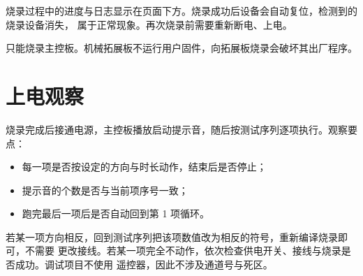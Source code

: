 烧录过程中的进度与日志显示在页面下方。烧录成功后设备会自动复位，检测到的烧录设备消失，
属于正常现象。再次烧录前需要重新断电、上电。

\begin{note}
只能烧录主控板。机械拓展板不运行用户固件，向拓展板烧录会破坏其出厂程序。
\end{note}

\section{上电观察}

烧录完成后接通电源，主控板播放启动提示音，随后按测试序列逐项执行。观察要点：

\begin{itemize}
  \item 每一项是否按设定的方向与时长动作，结束后是否停止；
  \item 提示音的个数是否与当前项序号一致；
  \item 跑完最后一项后是否自动回到第 1 项循环。
\end{itemize}

若某一项方向相反，回到测试序列把该项数值改为相反的符号，重新编译烧录即可，不需要
更改接线。若某一项完全不动作，依次检查供电开关、接线与烧录是否成功。调试项目不使用
遥控器，因此不涉及通道号与死区。
